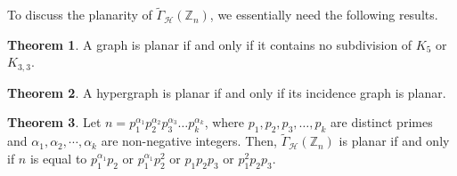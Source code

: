 \documentclass[11pt,a4paper]{article}
\theoremstyle{definition}
\newtheorem{theorem}{Theorem}[section]
\theoremstyle{remark}
\begin{document}
		To discuss the planarity  of  $\tilde{\Gamma}_\mathcal{H}(\mathbb{Z}_n)$, we essentially need the following results.
			\begin{theorem}\cite{walsh1975hypermaps}
			A graph  is planar if and only if it contains no subdivision of $K_5$ or $K_{3,3}$.
		\end{theorem}
		\begin{theorem}\cite{walsh1975hypermaps} 
			A hypergraph is planar if and only if its incidence graph is planar.
		\end{theorem}
	\begin{theorem}\label{planarity}
		Let $n=p_1^{\alpha_1}p_2^{\alpha_2}p_3^{\alpha_3} \ldots p_k^{\alpha_k}$, where $p_1, p_2,p_3, \ldots, p_k$ are distinct primes and $\alpha_1, \alpha_2, \cdots, \alpha_k$ are non-negative integers. Then,  $\tilde{\Gamma}_\mathcal{H}(\mathbb{Z}_n)$ is planar if and only if $n$ is equal to  $p_1^{\alpha_1}p_2$ or $p_1^{\alpha_1}p_2^2$ or  $p_1p_2p_3$ or $p_1^2p_2p_3$.
	\end{theorem}
\end{document}
